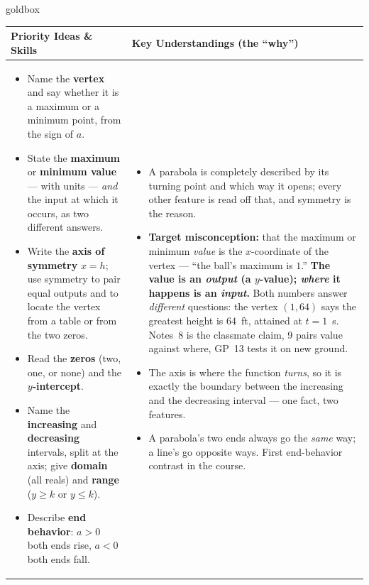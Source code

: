 \documentclass[10pt]{article}
\begin{document}
\renewcommand{\arraystretch}{1.4}
\boxguard
\begin{skillbox}{goldbox}
\begin{tabularx}{\linewidth}{@{}X|X@{}}
\textbf{Priority Ideas \& Skills} & \textbf{Key Understandings (the ``why'')} \\[2pt]
\hline
\vspace{-6pt}
\begin{itemize}[leftmargin=1.1em, nosep, after=\vspace{2pt}]
  \item Name the \textbf{vertex} and say whether it is a maximum or a minimum point, from the
        sign of $a$.
  \item State the \textbf{maximum} or \textbf{minimum value} --- with units --- \emph{and} the
        input at which it occurs, as two different answers.
  \item Write the \textbf{axis of symmetry} $x=h$; use symmetry to pair equal outputs and to
        locate the vertex from a table or from the two zeros.
  \item Read the \textbf{zeros} (two, one, or none) and the \textbf{$y$-intercept}.
  \item Name the \textbf{increasing} and \textbf{decreasing} intervals, split at the axis; give
        \textbf{domain} (all reals) and \textbf{range} ($y\ge k$ or $y\le k$).
  \item Describe \textbf{end behavior}: $a>0$ both ends rise, $a<0$ both ends fall.
\end{itemize}
&
\vspace{-6pt}
\begin{itemize}[leftmargin=1.1em, nosep, after=\vspace{2pt}]
  \item A parabola is completely described by its turning point and which way it opens; every
        other feature is read off that, and symmetry is the reason.
  \item \textbf{Target misconception:} that the maximum or minimum \emph{value} is the
        $x$-coordinate of the vertex --- ``the ball's maximum is $1$.'' \textbf{The value is an
        \emph{output} (a $y$-value); \emph{where} it happens is an \emph{input}.} Both numbers
        answer \emph{different} questions: the vertex $(1,64)$ says the greatest height is
        $64$~ft, attained at $t=1$~s. Notes~8 is the classmate claim, 9 pairs value against
        where, GP~13 tests it on new ground.
  \item The axis is where the function \emph{turns}, so it is exactly the boundary between the
        increasing and the decreasing interval --- one fact, two features.
  \item A parabola's two ends always go the \emph{same} way; a line's go opposite ways. First
        end-behavior contrast in the course.
\end{itemize}
\end{tabularx}
\end{skillbox}
\end{document}
